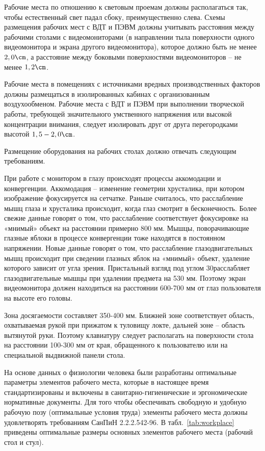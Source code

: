 Рабочие места по отношению к световым проемам должны располагаться так, чтобы естественный свет падал сбоку, преимущественно слева. Схемы размещения рабочих мест с ВДТ и ПЭВМ должны учитывать расстояния между рабочими столами с видеомониторами (в направлении тыла поверхности одного видеомонитора и экрана другого видеомонитора), которое должно быть не менее $2,0 \cm$, а расстояние между боковыми поверхностями видеомониторов -- не менее $1,2 \cm$.

Рабочие места в помещениях с источниками вредных производственных факторов должны размещаться в изолированных кабинах с организованным воздухообменом. Рабочие места с ВДТ и ПЭВМ при выполнении творческой работы, требующей значительного умственного напряжения или высокой концентрации внимания, следует изолировать друг от друга перегородками высотой $1,5 - 2,0 \cm$.

Размещение оборудования на рабочих столах должно отвечать следующим требованиям.

При работе с монитором в глазу происходят процессы аккомодации и конвергенции. Аккомодация -- изменение геометрии хрусталика, при котором изображение фокусируется на сетчатке. Раньше считалось, что расслабление мышц глаза и хрусталика происходит, когда глаз смотрит в бесконечность. Более свежие данные говорят о том, что расслабление соответствует фокусировке на «мнимый» объект на расстоянии примерно 800 мм. Мышцы, поворачивающие глазные яблоки в процессе конвергенции тоже находятся в постоянном напряжении. Новые данные говорят о том, что расслабление глазодвигательных мышц происходит при сведении глазных яблок на «мнимый» объект, удаление которого зависит от угла зрения. Пристальный взгляд под углом 30\textdegree расслабляет глазодвигательные мышцы при удалении предмета на 530 мм. Поэтому экран видеомонитора должен находиться на расстоянии 600-700 мм от глаз пользователя на высоте его головы.

Зона досягаемости составляет 350-400 мм. Ближней зоне соответствует область, охватываемая рукой при прижатом к туловищу локте, дальней зоне -- область вытянутой руки. Поэтому клавиатуру следует располагать на поверхности стола на расстоянии 100-300 мм от края, обращенного к пользователю или на специальной выдвижной панели стола.

На основе данных о физиологии человека были разработаны оптимальные параметры элементов рабочего места, которые в настоящее время стандартизированы и включены в санитарно-гигиенические и эргономические нормативные документы. Для того чтобы обеспечивать свободную и удобную рабочую позу (оптимальные условия труда) элементы рабочего места должны удовлетворять требованиям СанПиН 2.2.2.542-96. В табл.~\ref{tab:workplace} приведены оптимальные размеры основных элементов рабочего места (рабочий стол и стул).

